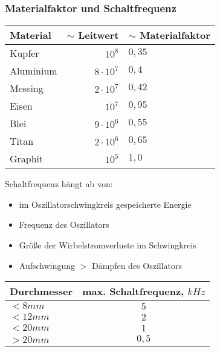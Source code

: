 \subsubsection{Materialfaktor und Schaltfrequenz}
\begin{tabular}{l | r l}
Material & $\sim $ Leitwert & $\sim $ Materialfaktor\\\hline
Kupfer & $10^8$ & $0,35$\\
Aluminium & $8\cdot 10^7$ & $0,4$\\
Messing & $2 \cdot 10^7$ & $0,42$\\
Eisen & $10^7$ & $0,95$\\
Blei & $9\cdot 10^6$ & $0,55$\\
Titan & $2 \cdot 10^6$ & $0,65$\\
Graphit & $10^5$ & $1,0$
\end{tabular}
Schaltfrequenz hängt ab von:
\begin{itemize}
\item im Oszillatorschwingkreis gespeicherte Energie
\item Frequenz des Oszillators
\item Größe der Wirbelstromverluste im Schwingkreis
\item Aufschwingung $>$ Dämpfen des Oszillators
\end{itemize}
\begin{tabular}{l | c}
Durchmesser & max. Schaltfrequenz, $\unit{kHz}$\\\hline
$<8 \unit{mm}$ & $5$\\
$<12 \unit{mm}$ & $2$\\
$<20\unit{mm}$ & $1$\\
$>20 \unit{mm}$ & $0,5$
\end{tabular}

